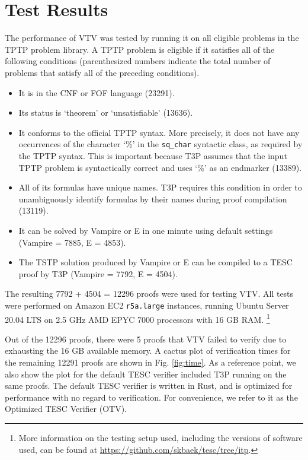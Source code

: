 \documentclass[12pt]{article}
\begin{document}
\section{Test Results} \label{sec:test-results}


The performance of VTV was tested by running it on all eligible problems 
in the TPTP \cite{sutcliffe2009tptp} problem library. A TPTP problem is eligible if it 
satisfies all of the following conditions (parenthesized numbers indicate 
the total number of problems that satisfy all of the preceding conditions).
\begin{itemize}
  \item It is in the CNF or FOF language (23291). 
  \item Its status is `theorem' or `unsatisfiable' (13636).
  \item It conforms to the official TPTP syntax. More precisely, 
    it does not have any occurrences of the character `\%' in the 
    \verb|sq_char| syntactic class, as required by the TPTP syntax.
    This is important because T3P assumes that the input TPTP problem 
    is syntactically correct and uses `\%' as an endmarker (13389).
  \item All of its formulas have unique names. T3P requires this condition 
    in order to unambiguously identify formulas by their names during 
    proof compilation (13119).
  \item It can be solved by Vampire or E in one minute using 
    default settings (Vampire = 7885, E = 4853).
  \item The TSTP solution produced by Vampire or E can be compiled to 
    a TESC proof by T3P (Vampire = 7792, E = 4504).
\end{itemize}
The resulting 7792 + 4504 = 12296 proofs were used for testing VTV.
All tests were performed on Amazon EC2 \texttt{r5a.large} instances, 
running Ubuntu Server 20.04 LTS on 2.5 GHz AMD EPYC 7000 processors with 
16 GB RAM. 
\footnote{
  More information on the testing setup used, including the versions of 
  software used, can be found at \url{https://github.com/skbaek/tesc/tree/itp}.
}

Out of the 12296 proofs, there were 5 proofs that VTV failed to verify 
due to exhausting the 16 GB available memory. A cactus plot of verification 
times for the remaining 12291 proofs are shown in Fig. \ref{fig:time}. 
As a reference point, we also show the plot for the default TESC verifier 
included T3P running on the same proofs. The default TESC verifier 
is written in Rust, and is optimized for performance with no regard to 
verification. For convenience, we refer to it as the Optimized TESC Verifier (OTV).
\end{document}
